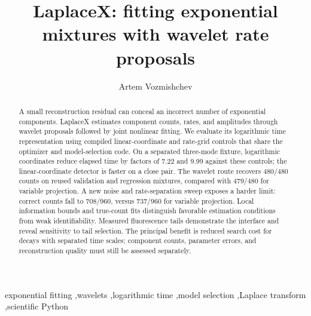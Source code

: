 \documentclass[preprint,11pt]{elsarticle}
\begin{document}
\begin{frontmatter}
\title{LaplaceX: fitting exponential mixtures with wavelet rate proposals}
\author[itmo]{Artem Vozmishchev}
\begin{abstract}
A small reconstruction residual can conceal an incorrect number of exponential
components. LaplaceX estimates component counts, rates, and amplitudes through
wavelet proposals followed by joint nonlinear fitting. We evaluate its logarithmic
time representation using compiled linear-coordinate and rate-grid controls that
share the optimizer and model-selection code. On a separated three-mode fixture,
logarithmic coordinates reduce elapsed time by factors of 7.22 and 9.99 against
these controls; the linear-coordinate detector is faster on a close pair.
The wavelet route recovers 480/480 counts on reused validation and regression
mixtures, compared with 479/480 for variable projection. A new noise and
rate-separation sweep exposes a harder limit: correct counts fall to 708/960,
versus 737/960 for variable projection. Local information bounds and true-count
fits distinguish favorable estimation conditions from weak identifiability.
Measured fluorescence tails demonstrate the interface and reveal sensitivity
to tail selection. The principal benefit is reduced search cost for decays
with separated time scales; component counts, parameter errors, and
reconstruction quality must still be assessed separately.
\end{abstract}
\begin{keyword}
exponential fitting \sep wavelets \sep logarithmic time \sep model selection \sep Laplace transform \sep scientific Python
\end{keyword}
\end{frontmatter}
\linenumbers
\end{document}
